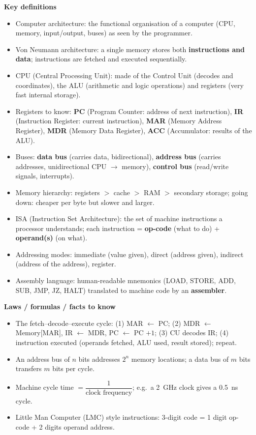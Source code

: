 \documentclass[11pt]{article}
\newcommand{\cle}[1]{{\popxbold\color{popdark}#1}}
\begin{document}
\begin{bilan}
\textbf{Key definitions}
\begin{itemize}
\item \cle{Computer architecture}: the functional organisation of a computer (CPU, memory, input/output, buses) as seen by the programmer.
\item \cle{Von Neumann architecture}: a single memory stores both \textbf{instructions and data}; instructions are fetched and executed sequentially.
\item \cle{CPU} (Central Processing Unit): made of the \cle{Control Unit} (decodes and coordinates), the \cle{ALU} (arithmetic and logic operations) and \cle{registers} (very fast internal storage).
\item \cle{Registers to know}: \textbf{PC} (Program Counter: address of next instruction), \textbf{IR} (Instruction Register: current instruction), \textbf{MAR} (Memory Address Register), \textbf{MDR} (Memory Data Register), \textbf{ACC} (Accumulator: results of the ALU).
\item \cle{Buses}: \textbf{data bus} (carries data, bidirectional), \textbf{address bus} (carries addresses, unidirectional CPU $\to$ memory), \textbf{control bus} (read/write signals, interrupts).
\item \cle{Memory hierarchy}: registers $>$ cache $>$ RAM $>$ secondary storage; going down: cheaper per byte but slower and larger.
\item \cle{ISA} (Instruction Set Architecture): the set of machine instructions a processor understands; each instruction = \textbf{op-code} (what to do) + \textbf{operand(s)} (on what).
\item \cle{Addressing modes}: immediate (value given), direct (address given), indirect (address of the address), register.
\item \cle{Assembly language}: human-readable mnemonics (LOAD, STORE, ADD, SUB, JMP, JZ, HALT) translated to machine code by an \textbf{assembler}.
\end{itemize}

\textbf{Laws / formulas / facts to know}
\begin{itemize}
\item The \cle{fetch--decode--execute cycle}: (1) MAR $\leftarrow$ PC; (2) MDR $\leftarrow$ Memory[MAR], IR $\leftarrow$ MDR, PC $\leftarrow$ PC $+1$; (3) CU decodes IR; (4) instruction executed (operands fetched, ALU used, result stored); repeat.
\item An address bus of $n$ bits addresses $2^n$ memory locations; a data bus of $m$ bits transfers $m$ bits per cycle.
\item Machine cycle time $= \dfrac{1}{\text{clock frequency}}$; e.g.\ a \SI{2}{GHz} clock gives a \SI{0.5}{ns} cycle.
\item Little Man Computer (LMC) style instructions: 3-digit code = 1 digit op-code + 2 digits operand address.
\end{itemize}


\end{bilan}
\end{document}

